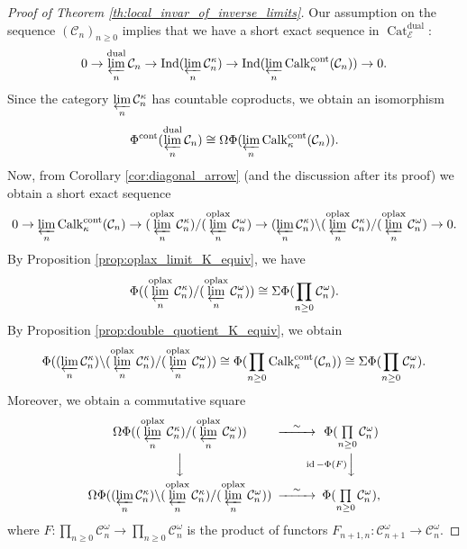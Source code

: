\documentclass[11pt,leqno]{amsart}
\numberwithin{equation}{section}
\newcommand{\prolim}[1][]{\mathop{\varprojlim}\limits_{#1}}
\newcommand{\prodd}[1][]{\mathop{\prod}\limits_{#1}}
\newcommand{\oplax}{\operatorname{oplax}}
\newcommand{\Cat}{\operatorname{Cat}}
\newcommand{\cont}{\operatorname{cont}}
\newcommand{\dual}{\operatorname{dual}}
\newcommand{\cC}{{\mathcal C}}
\newcommand{\cE}{{\mathcal E}}
\newcommand{\Ind}{\operatorname{Ind}}
\newcommand{\Calk}{\operatorname{Calk}}
\newcommand{\id}{\operatorname{id}}
\begin{document}
\begin{proof}[Proof of Theorem \ref{th:local_invar_of_inverse_limits}]
Our assumption on the sequence $(\cC_n)_{n\geq 0}$ implies that we have a short exact sequence in $\Cat_{\cE}^{\dual}:$
\begin{equation*}
0\to \prolim[n]^{\dual}\cC_n\to \Ind(\prolim[n]\cC_n^{\kappa})\to\Ind(\prolim[n]\Calk_{\kappa}^{\cont}(\cC_n))\to 0.
\end{equation*}
Since the category $\prolim[n]\cC_n^{\kappa}$ has countable coproducts, we obtain an isomorphism
\begin{equation}\label{eq:reduction_to_limit_of_Calkin}
\Phi^{\cont}(\prolim[n]^{\dual}\cC_n)\cong \Omega \Phi(\prolim[n]\Calk_{\kappa}^{\cont}(\cC_n)).	
\end{equation}
Now, from Corollary \ref{cor:diagonal_arrow} (and the discussion after its proof) we obtain a short exact sequence
\begin{equation}
\label{eq:short_exact_seq_limit_of_Calkin}
0\to \prolim[n]\Calk_{\kappa}^{\cont}(\cC_n)\to (\prolim[n]^{\oplax}\cC_n^{\kappa})/(\prolim[n]^{\oplax}\cC_n^{\omega})\to (\prolim[n]\cC_n^{\kappa})\backslash(\prolim[n]^{\oplax}\cC_n^{\kappa})/(\prolim[n]^{\oplax}\cC_n^{\omega})\to 0.
\end{equation}
By Proposition \ref{prop:oplax_limit_K_equiv}, we have
\begin{equation*}
\Phi((\prolim[n]^{\oplax}\cC_n^{\kappa})/(\prolim[n]^{\oplax}\cC_n^{\omega}))\cong \Sigma \Phi(\prodd[n\geq 0]\cC_n^{\omega}).
\end{equation*}
By Proposition \ref{prop:double_quotient_K_equiv}, we obtain
\begin{equation*}
\Phi((\prolim[n]\cC_n^{\kappa})\backslash(\prolim[n]^{\oplax}\cC_n^{\kappa})/(\prolim[n]^{\oplax}\cC_n^{\omega}))\cong \Phi(\prodd[n\geq 0]\Calk_{\kappa}^{\cont}(\cC_n))\cong \Sigma\Phi(\prodd[n\geq 0]\cC_n^{\omega}).
\end{equation*}
Moreover, we obtain a commutative square
\begin{equation}
\label{eq:comm_square_Phi_of_product}
\begin{CD}
\Omega \Phi((\prolim[n]^{\oplax}\cC_n^{\kappa})/(\prolim[n]^{\oplax}\cC_n^{\omega})) @>{\sim}>> \Phi(\prodd[n\geq 0]\cC_n^{\omega})\\
@VVV @V{\id-\Phi(F)}VV\\
\Omega \Phi((\prolim[n]\cC_n^{\kappa})\backslash(\prolim[n]^{\oplax}\cC_n^{\kappa})/(\prolim[n]^{\oplax}\cC_n^{\omega})) @>{\sim}>> \Phi(\prodd[n\geq 0]\cC_n^{\omega}),
\end{CD}
\end{equation}
where $F:\prodd[n\geq 0]\cC_n^{\omega}\to \prodd[n\geq 0]\cC_n^{\omega}$ is the product of functors $F_{n+1,n}:\cC_{n+1}^{\omega}\to\cC_n^{\omega}.$


\end{proof}
\end{document}
